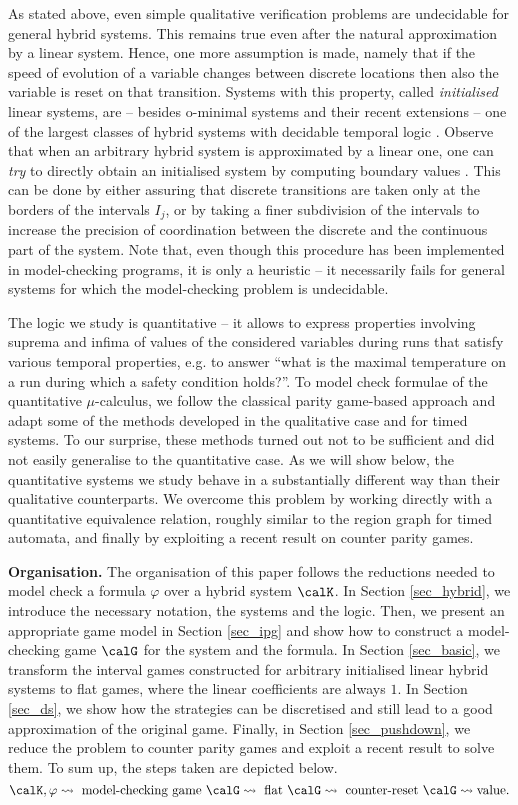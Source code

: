 \documentclass[fleqn,envcountsame]{LMCS}
\newcommand{\eg}{e.g.\xspace}
\renewcommand\phi{\varphi}
\begin{document}
As stated above, even simple
qualitative verification problems are undecidable for general hybrid systems.
This remains true even after the natural approximation by a linear system.
Hence, one more assumption is made, namely that if the speed of evolution of a
variable changes between discrete locations then also the variable is reset
on that transition. Systems with this property, called \emph{initialised}
linear systems, are -- besides o-minimal systems \cite{LPS00,BBC07} and their
recent extensions \cite{VPVD08} -- one of the largest classes of hybrid systems
with decidable temporal logic \cite{HKPV95}.
Observe that when an arbitrary hybrid system is approximated by a linear one,
one can \emph{try} to directly obtain an initialised system by computing
boundary values \cite{HHW96}. This can be done by either assuring that discrete
transitions are taken only at the borders of the intervals $I_j$, or by taking
a finer subdivision of the intervals to increase the precision of coordination
between the discrete and the continuous part of the system. Note that, even
though this procedure has been implemented in model-checking programs, it is
only a heuristic -- it necessarily fails for general systems for which the
model-checking problem is undecidable.

The logic we study is quantitative -- it allows to express properties involving
suprema and infima of values of the considered variables during runs that
satisfy various temporal properties, \eg to answer
``what is the maximal temperature on a run during which a safety condition
holds?''. To model check formulae of the quantitative $\mu$-calculus,
we follow the classical parity game-based approach
and adapt some of the methods developed in the qualitative
case and for timed systems. To our surprise, these methods turned out
not to be sufficient and did not easily generalise to
the quantitative case. As we will show below, the quantitative systems we study
behave in a substantially different way than their qualitative counterparts.
We overcome this problem by working directly with a quantitative
equivalence relation, roughly similar to the region graph for timed automata,
and finally by exploiting a recent result on counter parity games.

\textbf{Organisation.}
The organisation of this paper follows the reductions needed to model check
a formula $\phi$ over a hybrid system $\calK$. 
In Section \ref{sec_hybrid}, we introduce the necessary notation,
the systems and the logic. Then, we present
an appropriate game model in Section \ref{sec_ipg} and show how to 
construct a model-checking game $\calG$ for the system and the formula.
In Section \ref{sec_basic}, we transform the interval games constructed for
arbitrary initialised linear hybrid systems to flat games, where the linear
coefficients are always $1$. In Section \ref{sec_ds}, we show how the strategies
can be discretised and still lead to a good approximation of the original game.
Finally, in Section \ref{sec_pushdown}, we reduce the problem to counter
parity games and exploit a recent result to solve them.
To sum up, the steps taken are depicted below.
\[ \calK,\phi \leadsto \text{ model-checking game } \calG \leadsto
   \text{ flat } \calG \leadsto
   \text{ counter-reset } \calG \leadsto \text{value.} \]
\end{document}
